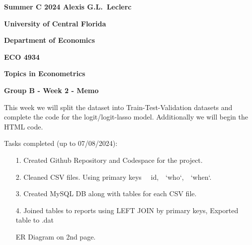 \documentclass[11pt]{book}
\begin{document}
\pagestyle{empty}
{\noindent\bf Summer C 2024 \hfill Alexis  G.L.~Leclerc}
\vskip 16pt
\centerline{\bf University of Central Florida}
\centerline{\bf Department of Economics}
\vskip 16pt
\centerline{\bf ECO 4934}
\centerline{\bf Topics in Econometrics}
\vskip 10pt
\centerline{\bf Group B - Week 2 - Memo}
\vskip 32pt
\noindent

This week we will split the dataset into Train-Test-Validation datasets and complete the code for the logit/logit-lasso model. Additionally we will begin the HTML code.
\begin{center}Tasks completed (up to 07/08/2024):\end{center}
\begin{itemize}
    \item[1.] Created Github Repository and Codespace for the project. 
    \item[2.] Cleaned CSV files. Using primary keys~~ id,~~`who`,~~`when`.
    \item[3.] Created MySQL DB along with tables for each CSV file. 
    \item[4.] Joined tables to reports using LEFT JOIN by primary keys, Exported table to .dat\vspace{\baselineskip}
\vspace{\baselineskip}

   \hspace{2em} ER Diagram on 2nd page.
\end{itemize}

\end{document}
